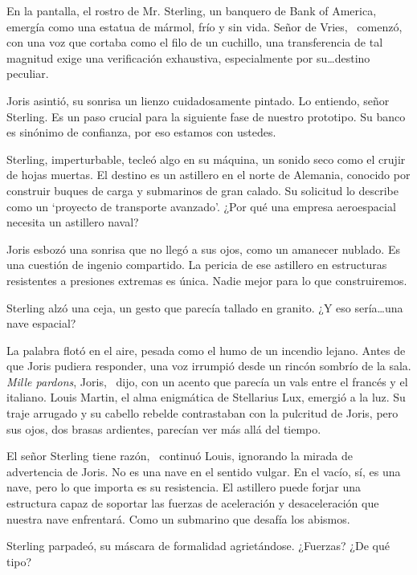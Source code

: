 En la pantalla, el rostro de Mr. Sterling, un banquero de Bank of America, emergía como una estatua de mármol, frío y sin vida. \glqq Señor de Vries,\grqq~ comenzó, con una voz que cortaba como el filo de un cuchillo, \glqq una transferencia de tal magnitud exige una verificación exhaustiva, especialmente por su\ldots destino peculiar.\grqq

Joris asintió, su sonrisa un lienzo cuidadosamente pintado. \glqq Lo entiendo, señor Sterling. Es un paso crucial para la siguiente fase de nuestro prototipo. Su banco es sinónimo de confianza, por eso estamos con ustedes.\grqq

Sterling, imperturbable, tecleó algo en su máquina, un sonido seco como el crujir de hojas muertas. \glqq El destino es un astillero en el norte de Alemania, conocido por construir buques de carga y submarinos de gran calado. Su solicitud lo describe como un `proyecto de transporte avanzado'. ¿Por qué una empresa aeroespacial necesita un astillero naval?\grqq

Joris esbozó una sonrisa que no llegó a sus ojos, como un amanecer nublado. \glqq Es una cuestión de ingenio compartido. La pericia de ese astillero en estructuras resistentes a presiones extremas es única. Nadie mejor para lo que construiremos.\grqq

Sterling alzó una ceja, un gesto que parecía tallado en granito. \glqq ¿Y eso sería\ldots una nave espacial?\grqq

La palabra flotó en el aire, pesada como el humo de un incendio lejano. Antes de que Joris pudiera responder, una voz irrumpió desde un rincón sombrío de la sala. \glqq \emph{Mille pardons}, Joris,\grqq~ dijo, con un acento que parecía un vals entre el francés y el italiano. Louis Martin, el alma enigmática de Stellarius Lux, emergió a la luz. Su traje arrugado y su cabello rebelde contrastaban con la pulcritud de Joris, pero sus ojos, dos brasas ardientes, parecían ver más allá del tiempo.

\glqq El señor Sterling tiene razón,\grqq~ continuó Louis, ignorando la mirada de advertencia de Joris. \glqq No es una nave en el sentido vulgar. En el vacío, sí, es una nave, pero lo que importa es su resistencia. El astillero puede forjar una estructura capaz de soportar las fuerzas de aceleración y desaceleración que nuestra nave enfrentará. Como un submarino que desafía los abismos.\grqq

Sterling parpadeó, su máscara de formalidad agrietándose. \glqq ¿Fuerzas? ¿De qué tipo?\grqq

